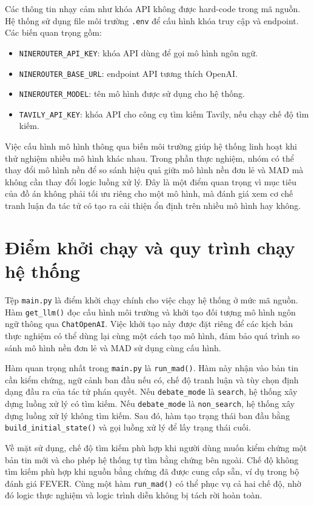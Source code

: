 ﻿\documentclass[oneside,a4paper,12pt]{extreport}
\begin{document}
Các thông tin nhạy cảm như khóa API không được hard-code trong mã nguồn. Hệ thống sử dụng file môi trường \texttt{.env} để cấu hình khóa truy cập và endpoint. Các biến quan trọng gồm:

\begin{itemize}
    \item \texttt{NINEROUTER\_API\_KEY}: khóa API dùng để gọi mô hình ngôn ngữ.
    \item \texttt{NINEROUTER\_BASE\_URL}: endpoint API tương thích OpenAI.
    \item \texttt{NINEROUTER\_MODEL}: tên mô hình được sử dụng cho hệ thống.
    \item \texttt{TAVILY\_API\_KEY}: khóa API cho công cụ tìm kiếm Tavily, nếu chạy chế độ tìm kiếm.
\end{itemize}

Việc cấu hình mô hình thông qua biến môi trường giúp hệ thống linh hoạt khi thử nghiệm nhiều mô hình khác nhau. Trong phần thực nghiệm, nhóm có thể thay đổi mô hình nền để so sánh hiệu quả giữa mô hình nền đơn lẻ và MAD mà không cần thay đổi logic luồng xử lý. Đây là một điểm quan trọng vì mục tiêu của đồ án không phải tối ưu riêng cho một mô hình, mà đánh giá xem cơ chế tranh luận đa tác tử có tạo ra cải thiện ổn định trên nhiều mô hình hay không.

\section{Điểm khởi chạy và quy trình chạy hệ thống}

Tệp \texttt{main.py} là điểm khởi chạy chính cho việc chạy hệ thống ở mức mã nguồn. Hàm \texttt{get\_llm()} đọc cấu hình môi trường và khởi tạo đối tượng mô hình ngôn ngữ thông qua \texttt{ChatOpenAI}. Việc khởi tạo này được đặt riêng để các kịch bản thực nghiệm có thể dùng lại cùng một cách tạo mô hình, đảm bảo quá trình so sánh mô hình nền đơn lẻ và MAD sử dụng cùng cấu hình.

Hàm quan trọng nhất trong \texttt{main.py} là \texttt{run\_mad()}. Hàm này nhận vào bản tin cần kiểm chứng, ngữ cảnh ban đầu nếu có, chế độ tranh luận và tùy chọn định dạng đầu ra của tác tử phán quyết. Nếu \texttt{debate\_mode} là \texttt{search}, hệ thống xây dựng luồng xử lý có tìm kiếm. Nếu \texttt{debate\_mode} là \texttt{non\_search}, hệ thống xây dựng luồng xử lý không tìm kiếm. Sau đó, hàm tạo trạng thái ban đầu bằng \texttt{build\_initial\_state()} và gọi luồng xử lý để lấy trạng thái cuối.

Về mặt sử dụng, chế độ tìm kiếm phù hợp khi người dùng muốn kiểm chứng một bản tin mới và cho phép hệ thống tự tìm bằng chứng bên ngoài. Chế độ không tìm kiếm phù hợp khi nguồn bằng chứng đã được cung cấp sẵn, ví dụ trong bộ đánh giá FEVER. Cùng một hàm \texttt{run\_mad()} có thể phục vụ cả hai chế độ, nhờ đó logic thực nghiệm và logic trình diễn không bị tách rời hoàn toàn.
\end{document}
